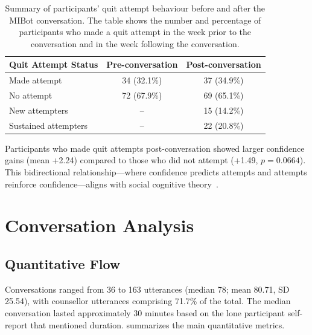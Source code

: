 \begin{table}[ht]
	\centering
	\small
	\setlength{\tabcolsep}{4pt}
	\renewcommand{\arraystretch}{1.1}
	\begin{tabular}{@{}lcc@{}}
		\toprule
		\textbf{Quit Attempt Status} & \textbf{Pre-conversation} & \textbf{Post-conversation} \\
		\midrule
		Made attempt                 & 34 (32.1\%)               & 37 (34.9\%)                \\
		No attempt                   & 72 (67.9\%)               & 69 (65.1\%)                \\
		\midrule
		New attempters               & --                        & 15 (14.2\%)                \\
		Sustained attempters         & --                        & 22 (20.8\%)                \\
		\bottomrule
	\end{tabular}
	\caption[Quit Attempt Behaviour Before and After MIBot]{Summary of participants' quit attempt behaviour before and after the MIBot conversation. The table shows the number and percentage of participants who made a quit attempt in the week prior to the conversation and in the week following the conversation.}
	\label{table:quit_attempts}
\end{table}

Participants who made quit attempts post-conversation showed larger confidence gains (mean +2.24) compared to those who did not attempt (+1.49, $p = 0.0664$). This bidirectional relationship---where confidence predicts attempts and attempts reinforce confidence---aligns with social cognitive theory~\citep{Bandura1986}.


\section{Conversation Analysis}
\label{sec:conversation-analysis}

\subsection*{Quantitative Flow}
\label{sec:conversation-dynamics}


Conversations ranged from 36 to 163 utterances (median 78; mean 80.71, SD 25.54), with counsellor utterances comprising 71.7\% of the total. The median conversation lasted approximately 30 minutes based on the lone participant self-report that mentioned duration.  summarizes the main quantitative metrics.

